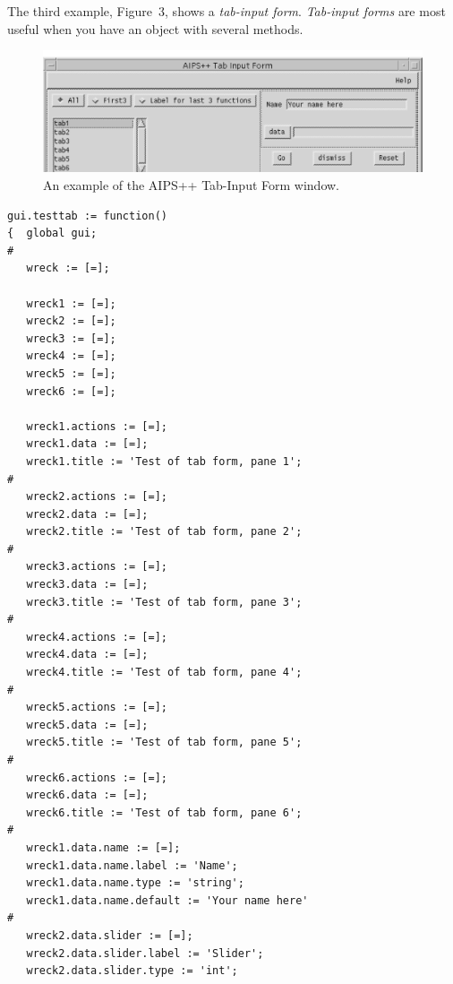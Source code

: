 The third example, Figure~3, shows a \textit{tab-input form}.  \textit{Tab-input forms} 
are most useful when you have an object with several methods.
\begin{figure}[here]
\includegraphics[width=\linewidth]{guitabframe}
\caption{An example of the AIPS++ Tab-Input Form window.}
\end{figure}
\begin{verbatim}
gui.testtab := function()
{  global gui;
#
   wreck := [=];
 
   wreck1 := [=];
   wreck2 := [=];
   wreck3 := [=];
   wreck4 := [=];
   wreck5 := [=];
   wreck6 := [=];
 
   wreck1.actions := [=];  
   wreck1.data := [=];  
   wreck1.title := 'Test of tab form, pane 1';
#
   wreck2.actions := [=];  
   wreck2.data := [=];  
   wreck2.title := 'Test of tab form, pane 2';
#
   wreck3.actions := [=];  
   wreck3.data := [=];  
   wreck3.title := 'Test of tab form, pane 3';
#
   wreck4.actions := [=];  
   wreck4.data := [=];  
   wreck4.title := 'Test of tab form, pane 4';
#
   wreck5.actions := [=];  
   wreck5.data := [=];  
   wreck5.title := 'Test of tab form, pane 5';
#
   wreck6.actions := [=];  
   wreck6.data := [=];  
   wreck6.title := 'Test of tab form, pane 6';
#
   wreck1.data.name := [=];
   wreck1.data.name.label := 'Name';
   wreck1.data.name.type := 'string';
   wreck1.data.name.default := 'Your name here'
#
   wreck2.data.slider := [=];
   wreck2.data.slider.label := 'Slider';
   wreck2.data.slider.type := 'int';
 

\end{verbatim}
